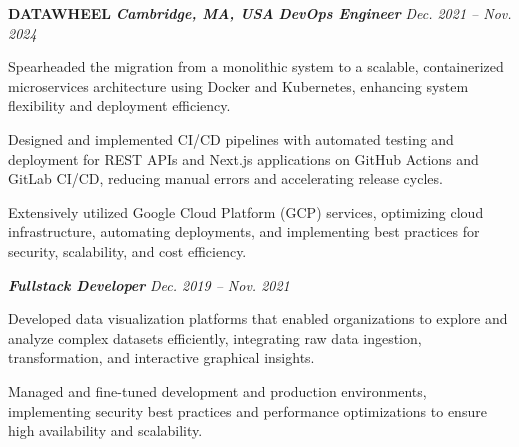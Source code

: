 \item
\headerrow
{\textbf{\uppercase{Datawheel}}}
{\textbf{\emph{Cambridge, MA, USA}}}
\headerrow
{\textbf{\emph{DevOps Engineer}}}
{\emph{Dec. 2021 -- Nov. 2024}}
\begin{itemize*}
    \item Spearheaded the migration from a monolithic system to a scalable, containerized microservices architecture using Docker and Kubernetes, enhancing system flexibility and deployment efficiency.
    \item Designed and implemented CI/CD pipelines with automated testing and deployment for REST APIs and Next.js applications on GitHub Actions and GitLab CI/CD, reducing manual errors and accelerating release cycles.
    \item Extensively utilized Google Cloud Platform (GCP) services, optimizing cloud infrastructure, automating deployments, and implementing best practices for security, scalability, and cost efficiency.
\end{itemize*}
\headerrow
{\textbf{\emph{Fullstack Developer}}}
{\emph{Dec. 2019 -- Nov. 2021}}
\begin{itemize*}
    \item Developed data visualization platforms that enabled organizations to explore and analyze complex datasets efficiently, integrating raw data ingestion, transformation, and interactive graphical insights.
    \item Managed and fine-tuned development and production environments, implementing security best practices and performance optimizations to ensure high availability and scalability.
\end{itemize*}